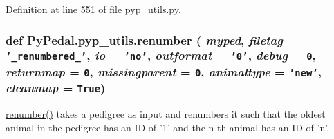 Definition at line 551 of file pyp\_\-utils.py.\hypertarget{namespacePyPedal_1_1pyp__utils_85325e092909bd5a86dd881933639ab1}{
\subsubsection[renumber]{\setlength{\rightskip}{0pt plus 5cm}def Py\-Pedal.pyp\_\-utils.renumber ( {\em myped},  {\em filetag} = {\tt '\_\-renumbered\_\-'},  {\em io} = {\tt 'no'},  {\em outformat} = {\tt '0'},  {\em debug} = {\tt 0},  {\em returnmap} = {\tt 0},  {\em missingparent} = {\tt 0},  {\em animaltype} = {\tt 'new'},  {\em cleanmap} = {\tt True})}}
\label{namespacePyPedal_1_1pyp__utils_85325e092909bd5a86dd881933639ab1}


\hyperlink{namespacePyPedal_1_1pyp__utils_85325e092909bd5a86dd881933639ab1}{renumber()} takes a pedigree as input and renumbers it such that the oldest animal in the pedigree has an ID of '1' and the n-th animal has an ID of 'n'. 

